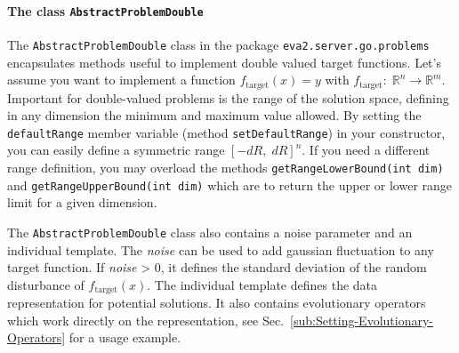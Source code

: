 \paragraph*{The class \texttt{AbstractProblemDouble}}

The \texttt{AbstractProblemDouble} class in the package \texttt{eva2.ser\-ver.go.prob\-lems}
encapsulates methods useful to implement double valued target functions.
Let's assume you want to implement a function $f_{\mathrm{target}}(x)=y$
with $f_{\mathrm{target}}:\;\mathbb{R}^{n}\rightarrow\mathbb{R}^{m}$.
Important for double-valued problems is the range of the solution
space, defining in any dimension the minimum and maximum value allowed.
By setting the \texttt{default\-Range} member variable (method \texttt{set\-Default\-Range})
in your constructor, you can easily define a symmetric range $[-dR,\; dR]^{n}$.
If you need a different range definition, you may overload the methods
\texttt{getRangeLowerBound(int dim)} and \texttt{getRangeUpperBound(int
dim)} which are to return the upper or lower range limit for a given
dimension.%

{} 

The \texttt{AbstractProblemDouble} class also contains a noise parameter
and an individual template. The \emph{noise} can be used to add gaussian
fluctuation to any target function. If \emph{noise} > 0, it defines
the standard deviation of the random disturbance of $f_{\mathrm{target}}(x)$.
The individual template defines the data representation for potential
solutions. It also contains evolutionary operators which work directly
on the representation, see Sec.~\ref{sub:Setting-Evolutionary-Operators}
for a usage example.

